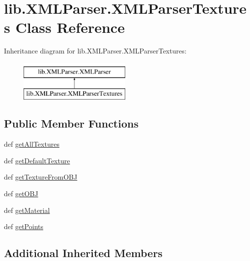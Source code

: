 \hypertarget{classlib_1_1_x_m_l_parser_1_1_x_m_l_parser_textures}{\section{lib.\-X\-M\-L\-Parser.\-X\-M\-L\-Parser\-Textures Class Reference}
\label{classlib_1_1_x_m_l_parser_1_1_x_m_l_parser_textures}
}
Inheritance diagram for lib.\-X\-M\-L\-Parser.\-X\-M\-L\-Parser\-Textures\-:\begin{figure}[H]
\begin{center}
\leavevmode
\includegraphics[height=2.000000cm]{classlib_1_1_x_m_l_parser_1_1_x_m_l_parser_textures}
\end{center}
\end{figure}
\subsection*{Public Member Functions}
\begin{DoxyCompactItemize}
\item 
def \hyperlink{classlib_1_1_x_m_l_parser_1_1_x_m_l_parser_textures_a299fce6b8f6e2ab356bd251db1203b1e}{get\-All\-Textures}
\item 
def \hyperlink{classlib_1_1_x_m_l_parser_1_1_x_m_l_parser_textures_a676158cf9fb52864123418bab67a4a87}{get\-Default\-Texture}
\item 
def \hyperlink{classlib_1_1_x_m_l_parser_1_1_x_m_l_parser_textures_a072025125cae05155d3602ae82ec4820}{get\-Texture\-From\-O\-B\-J}
\item 
def \hyperlink{classlib_1_1_x_m_l_parser_1_1_x_m_l_parser_textures_a81d05941104029338617a8824cbfb0e9}{get\-O\-B\-J}
\item 
def \hyperlink{classlib_1_1_x_m_l_parser_1_1_x_m_l_parser_textures_a5cdddec2db1d91c562a01103e024c110}{get\-Material}
\item 
def \hyperlink{classlib_1_1_x_m_l_parser_1_1_x_m_l_parser_textures_adf527727112cc04b55679c8082a659c5}{get\-Points}
\end{DoxyCompactItemize}
\subsection*{Additional Inherited Members}


